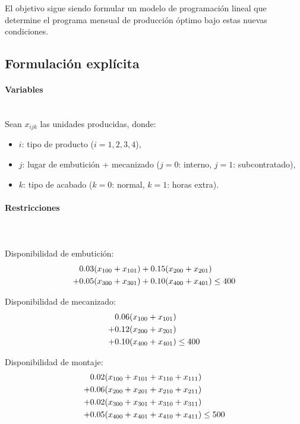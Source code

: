 El objetivo sigue siendo formular un modelo de programación lineal que determine el
programa mensual de producción óptimo bajo estas nuevas condiciones.


\subsection{Formulación explícita}

\paragraph{Variables}\mbox{}\\

Sean $x_{ijk}$ las unidades producidas, donde:
\begin{itemize}
    \item $i$: tipo de producto ($i=1,2,3,4$),
    \item $j$: lugar de embutición + mecanizado ($j=0$: interno, $j=1$: subcontratado),
    \item $k$: tipo de acabado ($k=0$: normal, $k=1$: horas extra).
\end{itemize}

\paragraph{Restricciones}\mbox{}\\
\\
Disponibilidad de embutición:
\begin{align}
0.03(x_{100}+x_{101}) + 0.15(x_{200}+x_{201}) & \notag \\
+ 0.05(x_{300}+x_{301}) + 0.10(x_{400}+x_{401}) & \leq 400
\end{align}

Disponibilidad de mecanizado:
\begin{align}
0.06(x_{100}+x_{101}) & \notag \\
+ 0.12(x_{200}+x_{201}) & \notag \\
+ 0.10(x_{400}+x_{401}) & \leq 400
\end{align}


Disponibilidad de montaje:
\begin{align}
0.02(x_{100}+x_{101}+x_{110}+x_{111}) & \notag \\
+0.06(x_{200}+x_{201}+x_{210}+x_{211}) & \notag \\
+0.02(x_{300}+x_{301}+x_{310}+x_{311}) & \notag \\
+0.05(x_{400}+x_{401}+x_{410}+x_{411}) & \leq 500 \label{eq:armesa-montaje}
\end{align}


